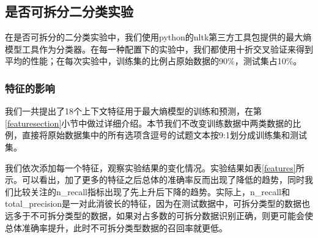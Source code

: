 \documentclass[master, winfont]{njuthesis}
\begin{document}
\subsection{是否可拆分二分类实验}
在是否可拆分的二分类实验中，我们使用python的nltk第三方工具包提供的最大熵模型工具作为分类器。在每一种配置下的实验中，我们都使用十折交叉验证来得到平均的性能；在每次实验中，训练集的比例占原始数据的90\%，测试集占10\%。

\subsubsection{特征的影响}
我们一共提出了18个上下文特征用于最大熵模型的训练和预测，在第\ref{featuresection}小节中做过详细介绍。本节我们不改变训练数据中两类数据的比例，直接将原始数据集中的所有选项含逗号的试题文本按9:1划分成训练集和测试集。

我们依次添加每一个特征，观察实验结果的变化情况。实验结果如表\ref{features}所示。可以看出，加了更多的特征之后总体的准确率反而出现了降低的趋势，同时我们比较关注的n\_recall指标出现了先上升后下降的趋势。实际上，n\_recall和total\_precision是一对此消彼长的特征，因为在测试数据中，可拆分类型的数据也远多于不可拆分类型的数据，如果对占多数的可拆分数据识别正确，则更可能会使总体准确率提升，此时不可拆分类型数据的召回率就更低。
\end{document}
